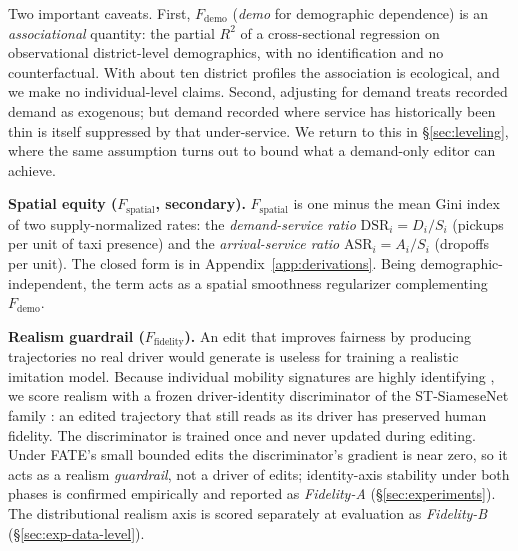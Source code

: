Two important caveats. First, $F_{\mathrm{demo}}$ (\emph{demo}
for demographic dependence) is an \emph{associational} quantity: the
partial $R^2$ of a cross-sectional regression on observational
district-level demographics, with no identification and no counterfactual.
With about ten district profiles the association is ecological,
and we make no in\-di\-vid\-ual-level claims. Second, adjusting for demand treats
recorded demand as exogenous; but demand recorded where service has
historically been thin is itself suppressed by that under-service. We return
to this in \S\ref{sec:leveling}, where the same assumption turns out to bound
what a demand-only editor can achieve.

\textbf{Spatial equity ($F_{\mathrm{spatial}}$, secondary).}
$F_{\mathrm{spatial}}$ is one minus the mean Gini index of two
supply-normalized rates: the \emph{demand-service ratio}
$\mathrm{DSR}_i = D_i / S_i$ (pickups per unit of taxi presence) and the
\emph{arrival-service ratio} $\mathrm{ASR}_i = A_i / S_i$ (dropoffs per
unit). The closed form is in Appendix~\ref{app:derivations}. Being
demographic-independent, the term acts as a spatial smoothness regularizer
complementing $F_{\mathrm{demo}}$.

\textbf{Realism guardrail ($F_{\mathrm{fidelity}}$).} An edit that improves
fairness by producing trajectories no real driver would generate is useless
for training a realistic imitation model. Because individual mobility signatures
are highly identifying \cite{gao2017tuler,zhou2018tulvae,miao2020deeptul}, we score
realism with a frozen driver-identity discriminator of the ST-SiameseNet
family \cite{ren2020stsiamese}: an edited trajectory that still reads as its
driver has preserved human fidelity. The discriminator is trained once and
never updated during editing. Under FATE's small bounded edits the discriminator's
gradient is near zero, so it acts as a realism \emph{guardrail}, not a driver
of edits; identity-axis stability under both phases is confirmed empirically
and reported as \emph{Fidelity-A} (\S\ref{sec:experiments}). The
distributional realism axis is scored separately at evaluation as
\emph{Fidelity-B} (\S\ref{sec:exp-data-level}).

